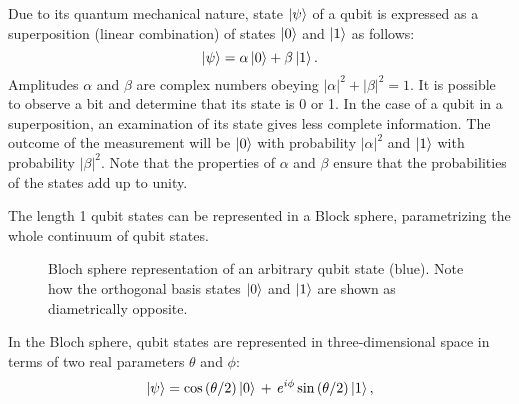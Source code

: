 Due to its quantum mechanical nature, state $\ket{\psi}$ of a qubit is expressed as a superposition (linear combination) of states $\ket{0}$ and $\ket{1}$ as follows:
\begin{equation}
    \ket{\psi}=\alpha\ket{0}+\beta\ket{1}.
\end{equation}
Amplitudes $\alpha$ and $\beta$ are complex numbers obeying $|\alpha|^2+|\beta|^2 = 1$. It is possible to observe a bit and determine that its state is 0 or 1. In the case of a qubit in a superposition, an examination of its state gives less complete information. The outcome of the measurement will be $\ket{0}$ with probability $|\alpha|^2$ and $\ket{1}$ with probability $|\beta|^2$. Note that the properties of $\alpha$ and $\beta$ ensure that the probabilities of the states add up to unity.

The length 1 qubit states can be represented in a Block sphere, parametrizing the whole continuum of qubit states.
\begin{figure}
    \centering
    \caption[Bloch sphere representation of a qubit state]{Bloch sphere representation of an arbitrary qubit state (blue). Note how the orthogonal basis states $\ket{0}$ and $\ket{1}$ are shown as diametrically opposite.}
    \end{figure}
In the Bloch sphere, qubit states are represented in three-dimensional space in terms of two real parameters $\theta$ and $\phi$:
\begin{equation}
    \ket{\psi} =\cos \left(\theta /2\right)\ket{0} \,+\,e^{i\phi }\sin \left(\theta /2\right)\ket{1},
\end{equation}
